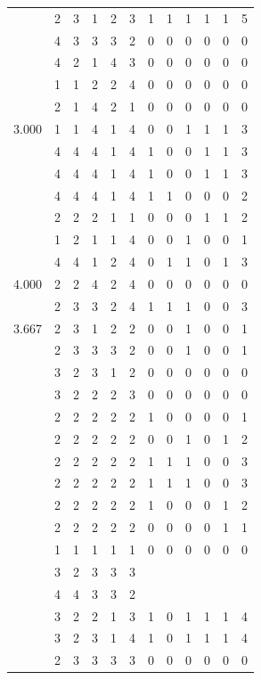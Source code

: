 \documentclass[]{book}
\theoremstyle{definition}
\theoremstyle{definition}
\theoremstyle{definition}
\theoremstyle{remark}
\begin{document}
\begin{table}
{\begin{tabular}[t]{rrrrrrrrrrrr}
 & 2 & 3 & 1 & 2 & 3 & 1 & 1 & 1 & 1 & 1 & 5\\
 & 4 & 3 & 3 & 3 & 2 & 0 & 0 & 0 & 0 & 0 & 0\\
 & 4 & 2 & 1 & 4 & 3 & 0 & 0 & 0 & 0 & 0 & 0\\
 & 1 & 1 & 2 & 2 & 4 & 0 & 0 & 0 & 0 & 0 & 0\\
 & 2 & 1 & 4 & 2 & 1 & 0 & 0 & 0 & 0 & 0 & 0\\
3.000 & 1 & 1 & 4 & 1 & 4 & 0 & 0 & 1 & 1 & 1 & 3\\
 & 4 & 4 & 4 & 1 & 4 & 1 & 0 & 0 & 1 & 1 & 3\\
 & 4 & 4 & 4 & 1 & 4 & 1 & 0 & 0 & 1 & 1 & 3\\
 & 4 & 4 & 4 & 1 & 4 & 1 & 1 & 0 & 0 & 0 & 2\\
 & 2 & 2 & 2 & 1 & 1 & 0 & 0 & 0 & 1 & 1 & 2\\
 & 1 & 2 & 1 & 1 & 4 & 0 & 0 & 1 & 0 & 0 & 1\\
 & 4 & 4 & 1 & 2 & 4 & 0 & 1 & 1 & 0 & 1 & 3\\
4.000 & 2 & 2 & 4 & 2 & 4 & 0 & 0 & 0 & 0 & 0 & 0\\
 & 2 & 3 & 3 & 2 & 4 & 1 & 1 & 1 & 0 & 0 & 3\\
3.667 & 2 & 3 & 1 & 2 & 2 & 0 & 0 & 1 & 0 & 0 & 1\\
 & 2 & 3 & 3 & 3 & 2 & 0 & 0 & 1 & 0 & 0 & 1\\
 & 3 & 2 & 3 & 1 & 2 & 0 & 0 & 0 & 0 & 0 & 0\\
 & 3 & 2 & 2 & 2 & 3 & 0 & 0 & 0 & 0 & 0 & 0\\
 & 2 & 2 & 2 & 2 & 2 & 1 & 0 & 0 & 0 & 0 & 1\\
 & 2 & 2 & 2 & 2 & 2 & 0 & 0 & 1 & 0 & 1 & 2\\
 & 2 & 2 & 2 & 2 & 2 & 1 & 1 & 1 & 0 & 0 & 3\\
 & 2 & 2 & 2 & 2 & 2 & 1 & 1 & 1 & 0 & 0 & 3\\
 & 2 & 2 & 2 & 2 & 2 & 1 & 0 & 0 & 0 & 1 & 2\\
 & 2 & 2 & 2 & 2 & 2 & 0 & 0 & 0 & 0 & 1 & 1\\
 & 1 & 1 & 1 & 1 & 1 & 0 & 0 & 0 & 0 & 0 & 0\\
 & 3 & 2 & 3 & 3 & 3 &  &  &  &  &  & \\
 & 4 & 4 & 3 & 3 & 2 &  &  &  &  &  & \\
 & 3 & 2 & 2 & 1 & 3 & 1 & 0 & 1 & 1 & 1 & 4\\
 & 3 & 2 & 3 & 1 & 4 & 1 & 0 & 1 & 1 & 1 & 4\\
 & 2 & 3 & 3 & 3 & 3 & 0 & 0 & 0 & 0 & 0 & 0\\

\end{tabular}}
\end{table}
\end{document}
